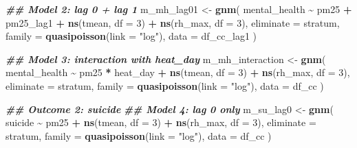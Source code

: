 \documentclass[
]{article}
\newenvironment{Shaded}{\begin{snugshade}}{\end{snugshade}}
\newcommand{\AttributeTok}[1]{\textcolor[rgb]{0.13,0.29,0.53}{#1}}
\newcommand{\DecValTok}[1]{\textcolor[rgb]{0.00,0.00,0.81}{#1}}
\newcommand{\DocumentationTok}[1]{\textcolor[rgb]{0.56,0.35,0.01}{\textbf{\textit{#1}}}}
\newcommand{\FunctionTok}[1]{\textcolor[rgb]{0.13,0.29,0.53}{\textbf{#1}}}
\newcommand{\NormalTok}[1]{#1}
\newcommand{\OtherTok}[1]{\textcolor[rgb]{0.56,0.35,0.01}{#1}}
\newcommand{\SpecialCharTok}[1]{\textcolor[rgb]{0.81,0.36,0.00}{\textbf{#1}}}
\newcommand{\StringTok}[1]{\textcolor[rgb]{0.31,0.60,0.02}{#1}}
\begin{document}
\begin{Shaded}
\begin{Highlighting}[]
\DocumentationTok{\#\# Model 2: lag 0 + lag 1}
\NormalTok{m\_mh\_lag01 }\OtherTok{\textless{}{-}} \FunctionTok{gnm}\NormalTok{(}
\NormalTok{  mental\_health }\SpecialCharTok{\textasciitilde{}}\NormalTok{ pm25 }\SpecialCharTok{+}\NormalTok{ pm25\_lag1 }\SpecialCharTok{+} \FunctionTok{ns}\NormalTok{(tmean, }\AttributeTok{df =} \DecValTok{3}\NormalTok{) }\SpecialCharTok{+} \FunctionTok{ns}\NormalTok{(rh\_max, }\AttributeTok{df =} \DecValTok{3}\NormalTok{),}
  \AttributeTok{eliminate =}\NormalTok{ stratum,}
  \AttributeTok{family =} \FunctionTok{quasipoisson}\NormalTok{(}\AttributeTok{link =} \StringTok{"log"}\NormalTok{),}
  \AttributeTok{data =}\NormalTok{ df\_cc\_lag1}
\NormalTok{)}
\end{Highlighting}
\end{Shaded}

\begin{Shaded}
\begin{Highlighting}[]
\DocumentationTok{\#\# Model 3: interaction with heat\_day}
\NormalTok{m\_mh\_interaction }\OtherTok{\textless{}{-}} \FunctionTok{gnm}\NormalTok{(}
\NormalTok{  mental\_health }\SpecialCharTok{\textasciitilde{}}\NormalTok{ pm25 }\SpecialCharTok{*}\NormalTok{ heat\_day }\SpecialCharTok{+} \FunctionTok{ns}\NormalTok{(tmean, }\AttributeTok{df =} \DecValTok{3}\NormalTok{) }\SpecialCharTok{+} \FunctionTok{ns}\NormalTok{(rh\_max, }\AttributeTok{df =} \DecValTok{3}\NormalTok{),}
  \AttributeTok{eliminate =}\NormalTok{ stratum,}
  \AttributeTok{family =} \FunctionTok{quasipoisson}\NormalTok{(}\AttributeTok{link =} \StringTok{"log"}\NormalTok{),}
  \AttributeTok{data =}\NormalTok{ df\_cc}
\NormalTok{)}
\end{Highlighting}
\end{Shaded}

\begin{Shaded}
\begin{Highlighting}[]
\DocumentationTok{\#\# Outcome 2: suicide}
\DocumentationTok{\#\# Model 4: lag 0 only}
\NormalTok{m\_su\_lag0 }\OtherTok{\textless{}{-}} \FunctionTok{gnm}\NormalTok{(}
\NormalTok{  suicide }\SpecialCharTok{\textasciitilde{}}\NormalTok{ pm25 }\SpecialCharTok{+} \FunctionTok{ns}\NormalTok{(tmean, }\AttributeTok{df =} \DecValTok{3}\NormalTok{) }\SpecialCharTok{+} \FunctionTok{ns}\NormalTok{(rh\_max, }\AttributeTok{df =} \DecValTok{3}\NormalTok{),}
  \AttributeTok{eliminate =}\NormalTok{ stratum,}
  \AttributeTok{family =} \FunctionTok{quasipoisson}\NormalTok{(}\AttributeTok{link =} \StringTok{"log"}\NormalTok{),}
  \AttributeTok{data =}\NormalTok{ df\_cc}
\NormalTok{)}
\end{Highlighting}
\end{Shaded}
\end{document}
